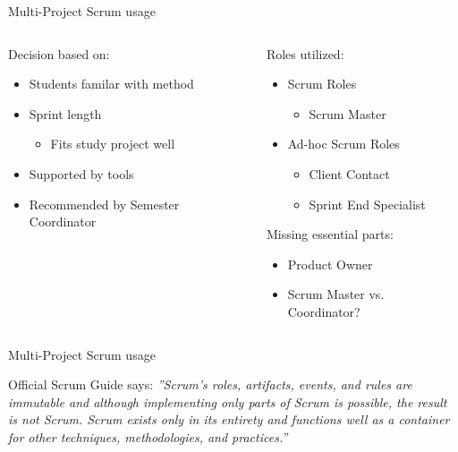 \begin{frame}{Multi-Project Scrum usage}
  \begin{columns}
  		\begin{column}{0.5\textwidth}
  			Decision based on:
  			\begin{itemize}
      		\item Students familar with method
      		\item Sprint length
        		\begin{itemize}
        		\item Fits study project well
        		\end{itemize}
      		\item Supported by tools
      		\item Recommended by Semester Coordinator
        \end{itemize}
  		\end{column}
  		
  		\pause
  		
  		\begin{column}{0.5\textwidth}
        Roles utilized:	
  	    \begin{itemize}
      	  \item Scrum Roles
        	  \begin{itemize}
        	    \item Scrum Master
        	  \end{itemize}
      		\item Ad-hoc Scrum Roles
        		\begin{itemize}
  	      		\item Client Contact
  	      		\item Sprint End Specialist
        		\end{itemize}
      	\end{itemize}
      	\pause
  	    \linespace
  			Missing essential parts:
    				\begin{itemize}
    				\item Product Owner
    				\item Scrum Master vs. Coordinator?
    				\end{itemize}
  		\end{column}
  \end{columns}
\end{frame}

\begin{frame}{Multi-Project Scrum usage}
  \begin{block}{Official Scrum Guide says:}
  \textit{''Scrum’s roles, artifacts, events, and rules are immutable and although implementing only parts of Scrum is possible, the result is not Scrum. 
  Scrum exists only in its entirety and functions well as a container for other techniques, methodologies, and practices.''}
  \end{block}
\end{frame}

